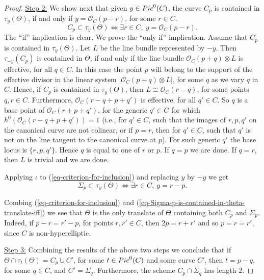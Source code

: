 \documentclass[10pt,a4paper]{amsart}
\newcommand{\Pic}{{\rm Pic}}
\newcommand{\StructureSheaf}[1]{{\mathcal O}_{#1}}
\begin{document}
\begin{proof}
\underline{Step 2:}
We show next that given $y\in\Pic^0(C)$, the curve $C_p$ is contained in $\tau_y(\Theta)$, if and only if $y=\StructureSheaf{C}(p-r)$, for some $r\in C$. 
\begin{equation}
\label{eq-criterion-for-inclusion}
C_p\subset \tau_y(\Theta) \Leftrightarrow \exists r\in C, \ y=\StructureSheaf{C}(p-r).
\end{equation}
The ``if'' implication is clear. We prove the ``only if'' implication. Assume that $C_p$ is contained in $\tau_y(\Theta)$.
Let $L$ be the line bundle represented by $-y$. Then $\tau_{-y}(C_p)$ is contained in $\Theta$, if and only if the line bundle $\StructureSheaf{C}(p+q)\otimes L$ is effective, for all $q\in C$.  In this case the point $p$ will belong to
the support of the effective divisor in the linear system $|\StructureSheaf{C}(p+q)\otimes L|$, for some $q$ as we vary $q$ in $C$.
Hence, if $C_p$ is contained in $\tau_y(\Theta)$, then $L\cong \StructureSheaf{C}(r-q)$, for some points $q, r\in C$.
Furthermore, $\StructureSheaf{C}(r-q+p+q')$ is effective, for all $q'\in C$. So $q$ is a base point of
$\StructureSheaf{C}(r+p+q')$, for the generic $q'\in C$ for which $h^0(\StructureSheaf{C}(r-q+p+q'))=1$ (i.e., for $q'\in C$, such that the images of $r, p, q'$ on the canonical curve are not colinear, or if $p=r$, then for $q'\in C$, such that $q'$ is not on the line tangent to the canonical curve at $p$). 
For such generic $q'$ the base locus is $\{r, p, q'\}$. 
Hence $q$ is equal to one of $r$ or $p$. If $q=p$ we are done. If $q=r$, then $L$ is trivial and we are done. 

Applying $\iota$ to (\ref{eq-criterion-for-inclusion}) and replacing $y$ by $-y$ we get
\begin{equation}
\label{eq-Sigma-p-is-contained-in-theta-translate-iff}
\Sigma_p\subset \tau_{y}(\Theta) \Leftrightarrow \exists r\in C, \ y=r-p.
\end{equation}

Combing (\ref{eq-criterion-for-inclusion}) and (\ref{eq-Sigma-p-is-contained-in-theta-translate-iff}) we see that $\Theta$ is the only translate of $\Theta$ containing both $C_p$ and $\Sigma_p$. Indeed, if $p-r=r'-p$, for points $r,r'\in C$, then $2p=r+r'$ and so $p=r=r'$, since $C$ is non-hyperelliptic.

\underline{Step 3:}
Combining the results of the above two steps we conclude that if $\Theta\cap\tau_t(\Theta)=C_p\cup C'$, for some $t\in \Pic^0(C)$ and some curve $C'$, then $t=p-q$, for some $q\in C$, and $C'=\Sigma_q$. Furthermore, the scheme $C_p\cap\Sigma_q$
has length $2$. 


\end{proof}
\end{document}
